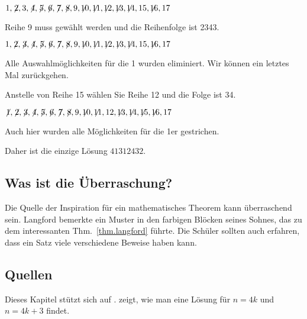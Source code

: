 $1,\not\! 2,3,\not\! 4,\not\! 5,\not\! 6,\not\! 7,\not\! 8,9,\not\!\! 10,\not\!\! 11,\not\!\! 12,\not\!\! 13,\not\!\! 14,15,\not\!\! 16,17$

\noindent Reihe 9 muss gewählt werden und die Reihenfolge ist 2{}34{}3.

$1,\not\! 2,\not\! 3,\not\! 4,\not\! 5,\not\! 6,\not\! 7,\not\! 8,9,\not\!\! 10,\not\!\! 11,\not\!\! 12,\not\!\! 13,\not\!\! 14,15,\not\!\! 16,17$

\noindent Alle Auswahlmöglichkeiten für die 1 wurden eliminiert. Wir können ein letztes Mal zurückgehen. 

\smallskip

\noindent Anstelle von Reihe 15 wählen Sie Reihe 12 und die Folge ist 3{}4\textvisiblespace {}.

$\not\! 1,\not\! 2,\not\! 3,\not\! 4,\not\! 5,\not\! 6,\not\! 7,\not\! 8,9,\not\!\! 10,\not\!\! 11,12,\not\!\! 13,\not\!\! 14,\not\!\! 15,\not\!\! 16,17$

\noindent Auch hier wurden alle Möglichkeiten für die 1er gestrichen.

\medskip

\noindent Daher ist die einzige Lösung $41312432$.

\subsection*{Was ist die Überraschung?}

Die Quelle der Inspiration für ein mathematisches Theorem kann überraschend sein. Langford bemerkte ein Muster in den farbigen Blöcken seines Sohnes, das zu dem interessanten Thm.~\ref{thm.langford} führte. Die Schüler sollten auch erfahren, dass ein Satz viele verschiedene Beweise haben kann.

\subsection*{Quellen}
Dieses Kapitel stützt sich auf \cite{miller}. \cite{davies} zeigt, wie man eine Lösung für $n=4k$ und $n=4k+3$ findet.
